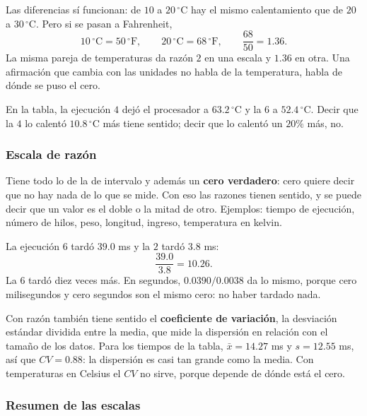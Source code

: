 \documentclass[11pt,letterpaper]{article}
\begin{document}
\begin{ejemplo}
    Las diferencias sí funcionan: de $10$ a $20\,^\circ$C hay el mismo
    calentamiento que de $20$ a $30\,^\circ$C. Pero si se pasan a
    Fahrenheit,
    \[
        10\,^\circ\text{C} = 50\,^\circ\text{F} ,
        \qquad
        20\,^\circ\text{C} = 68\,^\circ\text{F} ,
        \qquad
        \frac{68}{50} = 1.36 .
    \]
    La misma pareja de temperaturas da razón $2$ en una escala y $1.36$
    en otra. Una afirmación que cambia con las unidades no habla de la
    temperatura, habla de dónde se puso el cero.

    En la tabla, la ejecución $4$ dejó el procesador a $63.2\,^\circ$C y
    la $6$ a $52.4\,^\circ$C. Decir que la $4$ lo calentó
    $10.8\,^\circ$C más tiene sentido; decir que lo calentó un
    $20\%$ más, no.
\end{ejemplo}

\subsubsection*{Escala de razón}

Tiene todo lo de la de intervalo y además un \textbf{cero verdadero}:
cero quiere decir que no hay nada de lo que se mide. Con eso las
razones tienen sentido, y se puede decir que un valor es el doble o la
mitad de otro. Ejemplos: tiempo de ejecución, número de hilos, peso,
longitud, ingreso, temperatura en kelvin.

\begin{ejemplo}
    La ejecución $6$ tardó $39.0$ ms y la $2$ tardó $3.8$ ms:
    \[
        \frac{39.0}{3.8} = 10.26 .
    \]
    La $6$ tardó diez veces más. En segundos, $0.0390 / 0.0038$ da lo
    mismo, porque cero milisegundos y cero segundos son el mismo cero:
    no haber tardado nada.
\end{ejemplo}

Con razón también tiene sentido el \textbf{coeficiente de variación},
la desviación estándar dividida entre la media, que mide la dispersión
en relación con el tamaño de los datos. Para los tiempos de la tabla,
$\bar{x} = 14.27$ ms y $s = 12.55$ ms, así que $CV = 0.88$: la
dispersión es casi tan grande como la media. Con temperaturas en
Celsius el $CV$ no sirve, porque depende de dónde está el cero.

\subsubsection*{Resumen de las escalas}
\end{document}

